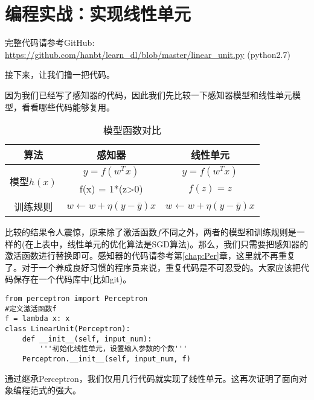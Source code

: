 \section{编程实战：实现线性单元}\label{Line:8}

\begin{note}
	完整代码请参考GitHub: \url{https://github.com/hanbt/learn_dl/blob/master/linear_unit.py}
	(python2.7)
\end{note}

接下来，让我们撸一把代码。

因为我们已经写了感知器的代码，因此我们先比较一下感知器模型和线性单元模型，看看哪些代码能够复用。

\begin{table}[htbp]
	\centering
	\setlength{\tabcolsep}{7mm}
	\caption{模型函数对比}
	\begin{tabular}{ccc}
		\hline
		算法                                   & 感知器                             & 线性单元                           \\ \hline
		\multirow{2}{*}{\centering 模型$h(x)$} & $y=f(w^Tx)$                        & $y=f(w^Tx)$                        \\
		                                       & f(x) = 1*(z>0)                     & $f(z)=z$                           \\
		训练规则                               & \({w}\gets{w}+\eta(y-\bar{y}){x}\) & \({w}\gets{w}+\eta(y-\bar{y}){x}\) \\ \hline
	\end{tabular}
\end{table}

比较的结果令人震惊，原来除了激活函数\(f\)不同之外，两者的模型和训练规则是一样的(在上表中，线性单元的优化算法是SGD算法)。那么，我们只需要把感知器的激活函数进行替换即可。感知器的代码请参考第\ref{chap:Per}章，这里就不再重复了。对于一个养成良好习惯的程序员来说，重复代码是不可忍受的。大家应该把代码保存在一个代码库中(比如git)。
\begin{lstlisting}
from perceptron import Perceptron
#定义激活函数f
f = lambda x: x
class LinearUnit(Perceptron):
    def __init__(self, input_num):
        '''初始化线性单元，设置输入参数的个数'''
    Perceptron.__init__(self, input_num, f)
\end{lstlisting}

通过继承Perceptron，我们仅用几行代码就实现了线性单元。这再次证明了面向对象编程范式的强大。

